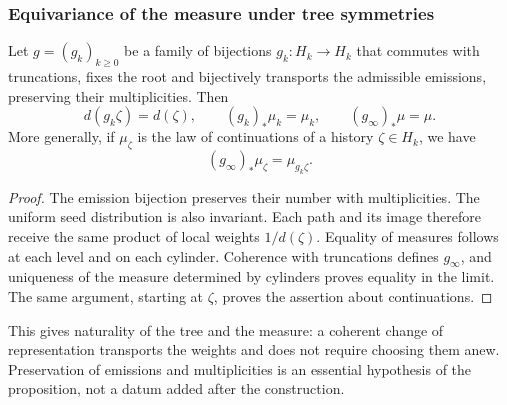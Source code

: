 \subsubsection{Equivariance of the measure under tree symmetries}
\label{ix:sec:ch-naturalidad-medida}

\begin{proposition}
\label{ix:prop:ch-naturalidad-medida}
Let \(g=(g_k)_{k\geq0}\) be a family of bijections \(g_k:H_k\to H_k\)
that commutes with truncations, fixes the root and bijectively transports
the admissible emissions, preserving their multiplicities. Then
\[
 d(g_k\zeta)=d(\zeta),\qquad
 (g_k)_*\mu_k=\mu_k,\qquad (g_\infty)_*\mu=\mu.
\]
More generally, if \(\mu_\zeta\) is the law of continuations of a
history \(\zeta\in H_k\), we have
\[
 (g_\infty)_*\mu_\zeta=\mu_{g_k\zeta}.
\]
\end{proposition}

\begin{proof}
The emission bijection preserves their number with multiplicities. The
uniform seed distribution is also invariant. Each path
and its image therefore receive the same product of local weights
\(1/d(\zeta)\). Equality of measures follows at each level and on
each cylinder. Coherence with truncations defines \(g_\infty\),
and uniqueness of the measure determined by cylinders proves equality
in the limit. The same argument, starting at \(\zeta\), proves the
assertion about continuations.
\end{proof}

This gives naturality of the tree and the measure: a coherent change
of representation transports the weights and does not require choosing them anew.
Preservation of emissions and multiplicities is an essential hypothesis of
the proposition, not a datum added after the construction.
